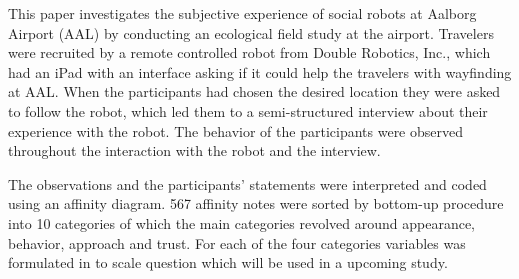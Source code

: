 \label{Abstract}
This paper investigates the subjective experience of social robots at Aalborg Airport (AAL) by conducting an ecological field study at the airport. Travelers were recruited by a remote controlled robot from Double Robotics, Inc., which had an iPad with an interface asking if it could help the travelers with wayfinding at AAL. When the participants had chosen the desired location they were asked to follow the robot, which led them to a semi-structured interview about their experience with the robot. The behavior of the participants were observed throughout the interaction with the robot and the interview. 

The observations and the participants' statements were interpreted and coded using an affinity diagram. 567 affinity notes were sorted by bottom-up procedure into 10 categories of which the main categories revolved around appearance, behavior, approach and trust. For each of the four categories variables was formulated in to scale question which will be used in a upcoming study. 

